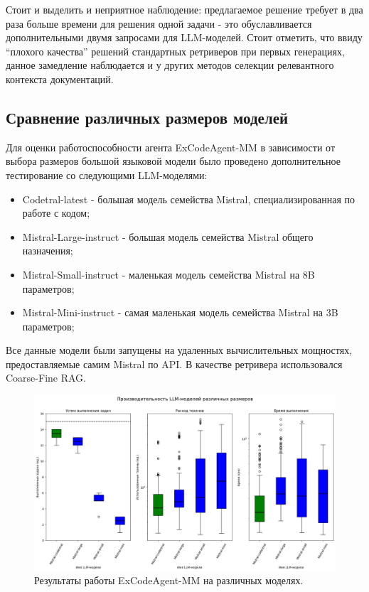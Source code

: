 Стоит и выделить и неприятное наблюдение: предлагаемое решение требует в два раза больше времени для решения
одной задачи - это обуславливается дополнительными двумя запросами для LLM-моделей. Стоит отметить, что ввиду
``плохого качества'' решений стандартных ретриверов при первых генерациях, данное замедление наблюдается и 
у других методов селекции релевантного контекста документаций. 

\subsection{Сравнение различных размеров моделей} \label{ch4:sec1:subsec4}

Для оценки работоспособности агента ExCodeAgent-MM в зависимости от выбора размеров большой языковой
модели было проведено дополнительное тестирование со следующими LLM-моделями:
\begin{itemize}
    \item Codetral-latest - большая модель семейства Mistral, специализированная по работе с кодом;
    \item Mistral-Large-instruct - большая модель семейства Mistral общего назначения;
    \item Mistral-Small-instruct - маленькая модель семейства Mistral на 8B параметров;
    \item Mistral-Mini-instruct - самая маленькая модель семейства Mistral на 3B параметров;
\end{itemize} 
Все данные модели были запущены на удаленных вычислительных мощностях, предоставляемые
самим Mistral по API. В качестве ретривера использовался Coarse-Fine RAG.

\begin{figure}
    \center
	\includegraphics[scale=0.42]{sources/stats_2.png}
	\caption{Результаты работы ExCodeAgent-MM на различных моделях.} 
	\label{fig:ch4:llms}  
\end{figure}

